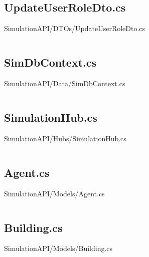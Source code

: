 \inputminted[linenos,breaklines,tabsize=2]{csharp}{/Users/Henry/Desktop/NEAComputerScience/SimulationAPI/DTOs/UpdateSimulationDto.cs}

\makeatletter
\subsection*{UpdateUserRoleDto.cs}
SimulationAPI/DTOs/UpdateUserRoleDto.cs
\def\@currentlabelname{UpdateUserRoleDto.cs}
\label{code:SimulationAPI:DTOs:UpdateUserRoleDto.cs}
\makeatother

\inputminted[linenos,breaklines,tabsize=2]{csharp}{/Users/Henry/Desktop/NEAComputerScience/SimulationAPI/DTOs/UpdateUserRoleDto.cs}

\makeatletter
\subsection*{SimDbContext.cs}
SimulationAPI/Data/SimDbContext.cs
\def\@currentlabelname{SimDbContext.cs}
\label{code:SimulationAPI:Data:SimDbContext.cs}
\makeatother

\inputminted[linenos,breaklines,tabsize=2]{csharp}{/Users/Henry/Desktop/NEAComputerScience/SimulationAPI/Data/SimDbContext.cs}

\makeatletter
\subsection*{SimulationHub.cs}
SimulationAPI/Hubs/SimulationHub.cs
\def\@currentlabelname{SimulationHub.cs}
\label{code:SimulationAPI:Hubs:SimulationHub.cs}
\makeatother

\inputminted[linenos,breaklines,tabsize=2]{csharp}{/Users/Henry/Desktop/NEAComputerScience/SimulationAPI/Hubs/SimulationHub.cs}

\makeatletter
\subsection*{Agent.cs}
SimulationAPI/Models/Agent.cs
\def\@currentlabelname{Agent.cs}
\label{code:SimulationAPI:Models:Agent.cs}
\makeatother

\inputminted[linenos,breaklines,tabsize=2]{csharp}{/Users/Henry/Desktop/NEAComputerScience/SimulationAPI/Models/Agent.cs}

\makeatletter
\subsection*{Building.cs}
SimulationAPI/Models/Building.cs
\def\@currentlabelname{Building.cs}
\label{code:SimulationAPI:Models:Building.cs}
\makeatother

